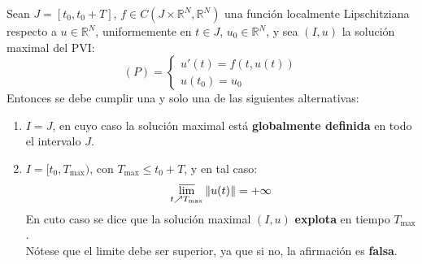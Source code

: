 \begin{teorema}
    Sean $J = [t_0, t_0 + T]$, $f \in C(J \times \mathbb{R}^N, \mathbb{R}^N)$ una función localmente Lipschitziana respecto a $u \in \mathbb{R}^N$, uniformemente en $t \in J$, $u_0 \in \mathbb{R}^N$, y sea $(I, u)$ la solución maximal del PVI:
    \[
        (P) =
        \begin{cases}
            u'(t) = f(t, u(t)) \\
            u(t_0) = u_0
        \end{cases}
    \]
    Entonces se debe cumplir una y solo una de las siguientes alternativas:
    \begin{enumerate}
        \item $I=J$, en cuyo caso la solución maximal está \textbf{globalmente definida} en todo el intervalo $J$.
        \item $I = [t_0, T_{\text{max}})$, con $T_{\text{max}} \leq t_0 + T$, y en tal caso:
        \[
            \varlimsup_{t \nearrow T_{\text{max}}} \| u(t) \| = +\infty
        \]
        En cuto caso se dice que la solución maximal $(I, u)$ \textbf{explota} en tiempo $T_{\text{max}}$.\\
        Nótese que el limite debe ser superior, ya que si no, la afirmación es \textbf{falsa}.
    \end{enumerate}
\end{teorema}

